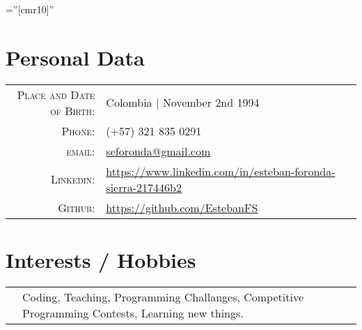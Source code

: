 \documentclass[a4paper,10pt]{article} %
\begin{document}
\pagestyle{empty} %

\font\fb=''[cmr10]'' %


\par{\bigskip\par} %

\section{Personal Data}

\begin{tabular}{rl}
\textsc{Place and Date of Birth:} & Colombia | November 2nd 1994\\
\textsc{Phone:} & (+57) 321 835 0291\\
\textsc{email:} & \href{mailto:seforonda@gmail.com}{seforonda@gmail.com}\\
\textsc{Linkedin:} & \href{https://www.linkedin.com/in/esteban-foronda-sierra-217446b2}{https://www.linkedin.com/in/esteban-foronda-sierra-217446b2}\\
\textsc{Github:} & \href{https://github.com/EstebanFS}{https://github.com/EstebanFS}\\
\end{tabular}



\section{Interests / Hobbies}
\begin{tabular}{r|p{11cm}}
& \footnotesize{Coding, Teaching, Programming Challanges, Competitive Programming Contests, Learning new things.}
\end{tabular}

\end{document}
